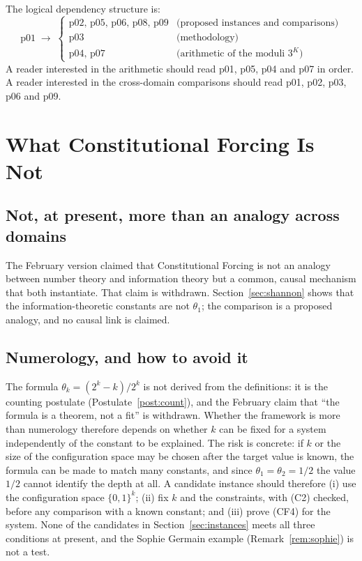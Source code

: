 \documentclass[12pt]{amsart}
\theoremstyle{plain}
\theoremstyle{definition}
\theoremstyle{remark}
\newcommand{\thetak}{\theta_k}
\begin{document}
\noindent The logical dependency structure is:
\[
  \text{p01} \;\longrightarrow\;
  \begin{cases}
    \text{p02, p05, p06, p08, p09} & \text{(proposed instances and comparisons)} \\
    \text{p03} & \text{(methodology)} \\
    \text{p04, p07} & \text{(arithmetic of the moduli $3^K$)}
  \end{cases}
\]
A reader interested in the arithmetic should read p01, p05, p04 and p07 in
order. A reader interested in the cross-domain comparisons should read p01,
p02, p03, p06 and p09.

\section{What Constitutional Forcing Is Not}
\label{sec:not}

\subsection{Not, at present, more than an analogy across domains}

The February version claimed that Constitutional Forcing is not an analogy
between number theory and information theory but a common, causal mechanism
that both instantiate. That claim is withdrawn. Section~\ref{sec:shannon}
shows that the information-theoretic constants are not $\theta_1$; the
comparison is a proposed analogy, and no causal link is claimed.

\subsection{Numerology, and how to avoid it}

The formula $\thetak = (2^k-k)/2^k$ is not derived from the definitions: it is
the counting postulate (Postulate~\ref{post:count}), and the February claim
that ``the formula is a theorem, not a fit'' is withdrawn. Whether the
framework is more than numerology therefore depends on whether $k$ can be fixed
for a system independently of the constant to be explained. The risk is
concrete: if $k$ or the size of the configuration space may be chosen after the
target value is known, the formula can be made to match many constants, and
since $\theta_1 = \theta_2 = 1/2$ the value $1/2$ cannot identify the depth at
all. A candidate instance should therefore
(i) use the configuration space $\{0,1\}^k$;
(ii) fix $k$ and the constraints, with (C2) checked, before any comparison with
a known constant; and
(iii) prove (CF4) for the system.
None of the candidates in Section~\ref{sec:instances} meets all three
conditions at present, and the Sophie Germain example (Remark~\ref{rem:sophie})
is not a test.
\end{document}
